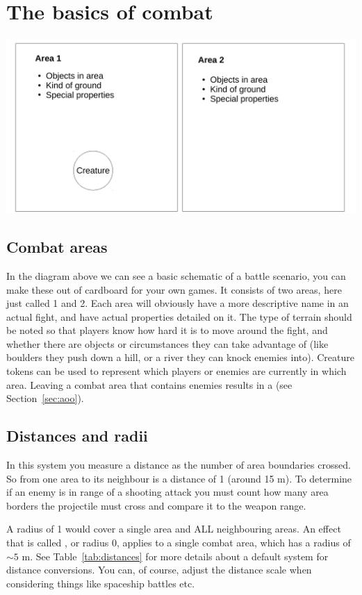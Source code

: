 \documentclass[a4paper,10pt,oneside]{book}
\newcommand{\textlf}[1]{\textbf{\titlecap{#1}}}
\newcommand{\textlfirst}[1]{\textbf{\textit{\titlecap{#1}}}}
\begin{document}
\section{The basics of combat}

\includegraphics[scale=0.5]{combat0}

\subsection{Combat areas}
In the diagram above we can see a basic schematic of a battle scenario, you can make these out of cardboard for your own games. It consists of two areas, here just called 1 and 2. Each area will obviously have a more descriptive name in an actual fight, and have actual properties detailed on it. The type of terrain should be noted so that players know how hard it is to move around the fight, and whether there are objects or circumstances they can take advantage of (like boulders they push down a hill, or a river they can knock enemies into). Creature tokens can be used to represent which players or enemies are currently in which area. Leaving a combat area that contains enemies results in a \textlf{Moment of weakness} (see Section~\ref{sec:aoo}).

\subsection{Distances and radii}
In this system you measure a distance as the number of area boundaries crossed. So from one area to its neighbour is a distance of 1 (around 15 m). To determine if an enemy is in range of a shooting attack you must count how many area borders the projectile must cross and compare it to the weapon range. 

A radius of 1 would cover a single area and ALL neighbouring areas. An effect that is called \textlfirst{adjacent}, or radius 0, applies to a single combat area, which has a radius of $\sim 5$ m. See Table~\ref{tab:distances} for more details about a default system for distance conversions. You can, of course, adjust the distance scale when considering things like spaceship battles etc. 
\end{document}
